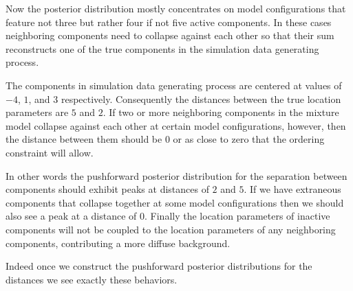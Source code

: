 \documentclass[
  letterpaper,
  DIV=11,
  numbers=noendperiod]{scrartcl}
\begin{document}
Now the posterior distribution mostly concentrates on model
configurations that feature not three but rather four if not five active
components. In these cases neighboring components need to collapse
against each other so that their sum reconstructs one of the true
components in the simulation data generating process.

The components in simulation data generating process are centered at
values of \(-4\), \(1\), and \(3\) respectively. Consequently the
distances between the true location parameters are \(5\) and \(2\). If
two or more neighboring components in the mixture model collapse against
each other at certain model configurations, however, then the distance
between them should be \(0\) or as close to zero that the ordering
constraint will allow.

In other words the pushforward posterior distribution for the separation
between components should exhibit peaks at distances of \(2\) and \(5\).
If we have extraneous components that collapse together at some model
configurations then we should also see a peak at a distance of \(0\).
Finally the location parameters of inactive components will not be
coupled to the location parameters of any neighboring components,
contributing a more diffuse background.

Indeed once we construct the pushforward posterior distributions for the
distances we see exactly these behaviors.
\end{document}
